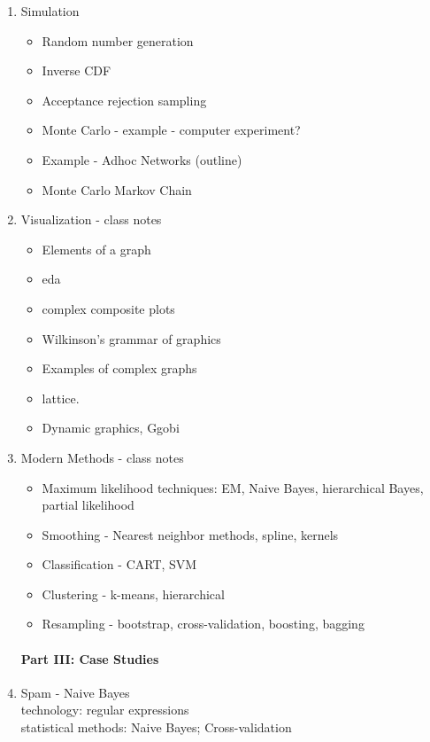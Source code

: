 \documentclass[11pt,timesroman]{article}
\begin{document}
\begin{enumerate}
\item{Simulation}
        \begin{itemize}
        \item Random number generation
        \item Inverse CDF
        \item Acceptance rejection sampling
        \item Monte Carlo - example - computer experiment?
        \item Example - Adhoc Networks (outline)
        \item Monte Carlo Markov Chain
        \end{itemize}


\item{Visualization - class notes}
        \begin{itemize}
        \item Elements of a graph
        \item eda
        \item complex composite plots
        \item Wilkinson's grammar of graphics
        \item Examples of complex graphs
        \item lattice.
        \item Dynamic graphics, Ggobi
        \end{itemize}

\item{Modern Methods - class notes}
        \begin{itemize}
        \item Maximum likelihood techniques: EM, Naive Bayes, hierarchical Bayes, partial likelihood
        \item Smoothing - Nearest neighbor methods, spline, kernels
        \item Classification - CART, SVM
        \item Clustering - k-means, hierarchical
        \item Resampling - bootstrap, cross-validation, boosting, bagging
        \end{itemize}

\paragraph{Part III: Case Studies}


\item{Spam - Naive Bayes}
\\
technology: regular expressions
\\
statistical methods: Naive Bayes; Cross-validation


\end{enumerate}
\end{document}
